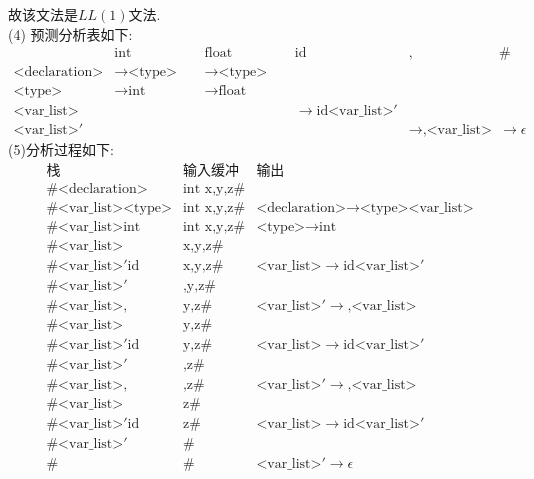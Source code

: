 \documentclass{article}
\begin{document}
故该文法是$LL(1)$文法. \\
(4)
预测分析表如下:
\[
\begin{array}{|l|l|l|l|l|l|}
     & \text{int} & \text{float} & \text{id} & \text{,} & \#\\
    \hline
    \text{<declaration>} & \to \text{<type><var\_list>} & \to \text{<type><var\_list>} & & & \\
    \hline
    \text{<type>} & \to \text{int} & \to \text{float} & & & \\
    \hline
    \text{<var\_list>} & & & \to \text{id} \text{<var\_list>}' & & \\
    \hline
    \text{<var\_list>}' & & & & \to \text{,<var\_list>} & \to \epsilon
\end{array}
\]
(5)分析过程如下:
\[
\begin{array}{|l|l|l|}
    \text{栈} & \text{输入缓冲} & \text{输出} \\
    \hline
    \text{\#<declaration>} & \text{int x,y,z\#} & \\
    \hline
    \text{\#<var\_list><type>} & \text{int x,y,z\#} & \text{<declaration>} \to \text{<type><var\_list>} \\
    \hline
    \text{\#<var\_list>int} & \text{int x,y,z\#} & \text{<type>} \to \text{int} \\
    \hline
    \text{\#<var\_list>} & \text{x,y,z\#} & \\
    \hline
    \text{\#}\text{<var\_list>}'\text{id} & \text{x,y,z\#} & \text{<var\_list>} \to \text{id} \text{<var\_list>}' \\
    \hline
    \text{\#}\text{<var\_list>}' & \text{,y,z\#} & \\
    \hline
    \text{\#<var\_list>,} & \text{y,z\#} & \text{<var\_list>}' \to \text{,<var\_list>} \\
    \hline
    \text{\#<var\_list>} & \text{y,z\#} & \\
    \hline
    \text{\#}\text{<var\_list>}'\text{id} & \text{y,z\#} & \text{<var\_list>} \to \text{id} \text{<var\_list>}' \\
    \hline
    \text{\#}\text{<var\_list>}' & \text{,z\#} & \\
    \hline
    \text{\#<var\_list>,} & \text{,z\#} & \text{<var\_list>}' \to \text{,<var\_list>} \\
    \hline
    \text{\#<var\_list>} & \text{z\#} & \\
    \hline
    \text{\#}\text{<var\_list>}'\text{id} & \text{z\#} & \text{<var\_list>} \to \text{id} \text{<var\_list>}' \\
    \hline
    \text{\#}\text{<var\_list>}' & \text{\#} & \\
    \hline
    \text{\#} & \text{\#} & \text{<var\_list>}' \to \epsilon 
\end{array}
\]
\end{document}
